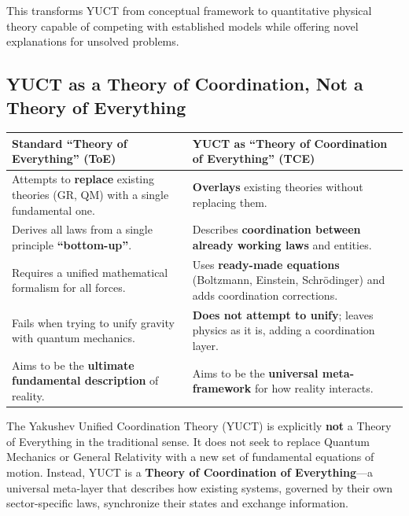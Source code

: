 \documentclass[11pt,a4paper]{article}
\begin{document}
This transforms YUCT from conceptual framework to quantitative physical theory capable of competing with established models while offering novel explanations for unsolved problems.


\subsection{YUCT as a Theory of Coordination, Not a Theory of Everything}
\label{subsec:not-toe}

\begin{tcolorbox}[title=YUCT vs. Standard Theories of Everything (ToE), 
	colback=blue!5!white, colframe=blue!50!black, 
	fonttitle=\bfseries, sharp corners]
	\small
	\begin{table}[H]
		\centering
		\begin{tabular}{p{} p{}}
			\toprule
			\textbf{Standard “Theory of Everything” (ToE)} & \textbf{YUCT as “Theory of Coordination of Everything” (TCE)} \\
			\midrule
			Attempts to \textbf{replace} existing theories (GR, QM) with a single fundamental one. & \textbf{Overlays} existing theories without replacing them. \\
			\addlinespace
			Derives all laws from a single principle \textbf{“bottom-up”}. & Describes \textbf{coordination between already working laws} and entities. \\
			\addlinespace
			Requires a unified mathematical formalism for all forces. & Uses \textbf{ready-made equations} (Boltzmann, Einstein, Schrödinger) and adds coordination corrections. \\
			\addlinespace
			Fails when trying to unify gravity with quantum mechanics. & \textbf{Does not attempt to unify}; leaves physics as it is, adding a coordination layer. \\
			\addlinespace
			Aims to be the \textbf{ultimate fundamental description} of reality. & Aims to be the \textbf{universal meta-framework} for how reality interacts. \\
			\bottomrule
		\end{tabular}
	\end{table}
\end{tcolorbox}

\vspace{0.5cm}
\noindent
The Yakushev Unified Coordination Theory (YUCT) is explicitly \textbf{not} a Theory of Everything in the traditional sense. It does not seek to replace Quantum Mechanics or General Relativity with a new set of fundamental equations of motion. Instead, YUCT is a \textbf{Theory of Coordination of Everything}---a universal meta-layer that describes how existing systems, governed by their own sector-specific laws, synchronize their states and exchange information.
\end{document}
